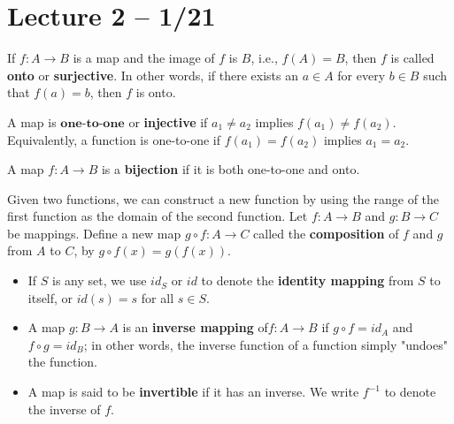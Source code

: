 \documentclass{article}
\begin{document}
\section{Lecture 2 -- 1/21}
\begin{definition}
  If $f:A\to B$ is a map and the image of $f$ is $B$, i.e., $f(A)=B$, then $f$ is called \textbf{onto} or \textbf{surjective}. In other words, if there exists an $a\in A$ for every $b\in B$ such that $f(a)=b$, then $f$ is onto.
\end{definition}
\begin{definition}
  A map is $\textbf{one-to-one}$ or \textbf{injective} if $a_1\neq a_2$ implies $f(a_1)\neq f(a_2).$ Equivalently, a function is one-to-one if $f(a_1)=f(a_2)$ implies $a_1=a_2$.
\end{definition}
\begin{definition}
  A map $f:A\to B$ is a \textbf{bijection} if it is both one-to-one and onto.
\end{definition}
\begin{definition}
  Given two functions, we can construct a new function by using the range of the first function as the domain of the second function. Let $f:A\to B$ and $g:B\to C$ be mappings. Define a new map $g\circ f:A\to C$ called the \textbf{composition} of $f$ and $g$ from $A$ to $C$, by $g\circ f(x)=g(f(x))$.
\end{definition}
\begin{itemize}
  \item If $S$ is any set, we use $id_S$ or $id$ to denote the \textbf{identity mapping} from $S$ to itself, or $id(s)=s$ for all $s\in S$.
  \item A map $g:B\to A$ is an \textbf{inverse mapping} of$f:A\to B$ if $g\circ f=id_A$ and $f\circ g=id_B$; in other words, the inverse function of a function simply "undoes" the function.
  \item A map is said to be \textbf{invertible} if it has an inverse. We write $f^{-1}$ to denote the inverse of $f$.
\end{itemize}
\end{document}

